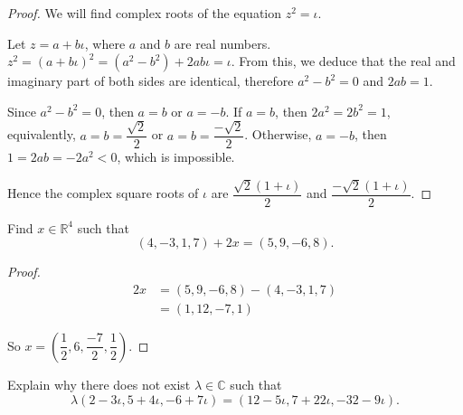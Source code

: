 \begin{proof}
    We will find complex roots of the equation $z^{2} = \iota$.

    Let $z = a + b\iota$, where $a$ and $b$ are real numbers. $z^{2} = {(a + b\iota)}^{2} = (a^{2} - b^{2}) + 2ab\iota = \iota$. From this, we deduce that the real and imaginary part of both sides are identical, therefore $a^{2} - b^{2} = 0$ and $2ab = 1$.

    Since $a^{2} - b^{2} = 0$, then $a = b$ or $a = -b$. If $a = b$, then $2a^{2} = 2b^{2} = 1$, equivalently, $a = b = \dfrac{\sqrt{2}}{2}$ or $a = b = \dfrac{-\sqrt{2}}{2}$. Otherwise, $a = -b$, then $1 = 2ab = -2a^{2} < 0$, which is impossible.

    Hence the complex square roots of $\iota$ are $\dfrac{\sqrt{2}(1 + \iota)}{2}$ and $\dfrac{-\sqrt{2}(1 + \iota)}{2}$.
\end{proof}

\begin{exercise}
    Find $x\in \mathbb{R}^{4}$ such that
    \[
        (4, -3, 1, 7) + 2x = (5, 9, -6, 8).
    \]
\end{exercise}

\begin{proof}
    \begin{align*}
        2x & = (5, 9, -6, 8) - (4, -3, 1, 7) \\
           & = (1, 12, -7, 1)
    \end{align*}

    So $x = \left(\dfrac{1}{2}, 6, \dfrac{-7}{2}, \dfrac{1}{2}\right)$.
\end{proof}

\begin{exercise}
    Explain why there does not exist $\lambda\in\mathbb{C}$ such that
    \[
        \lambda (2 - 3\iota, 5 + 4\iota, -6 + 7\iota) = (12 - 5\iota, 7 + 22\iota, -32 - 9\iota).
    \]
\end{exercise}

